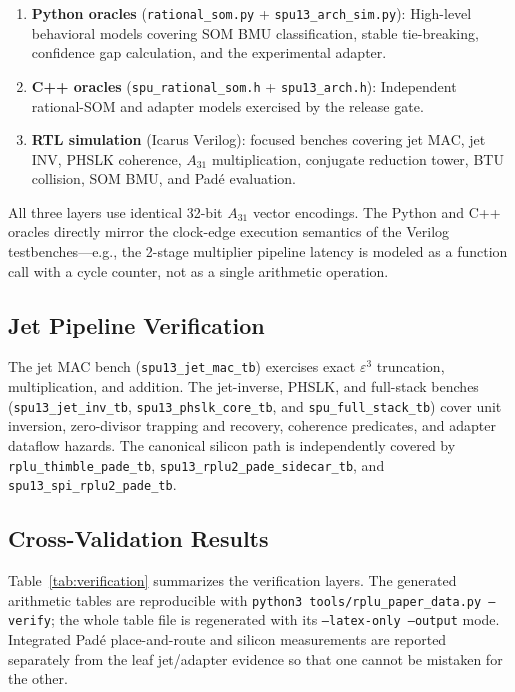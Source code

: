 \documentclass[conference]{IEEEtran}
\begin{document}
\begin{enumerate}
\item \textbf{Python oracles} (\texttt{rational\_som.py} + \texttt{spu13\_arch\_sim.py}):
High-level behavioral models covering SOM BMU classification, stable
tie-breaking, confidence gap calculation, and the experimental adapter.
\item \textbf{C++ oracles} (\texttt{spu\_rational\_som.h} + \texttt{spu13\_arch.h}):
Independent rational-SOM and adapter models exercised by the release gate.
\item \textbf{RTL simulation} (Icarus Verilog): focused benches covering
jet MAC, jet INV, PHSLK coherence, $A_{31}$ multiplication,
conjugate reduction tower, BTU collision, SOM BMU, and Pad\'{e} evaluation.
\end{enumerate}

All three layers use identical 32-bit $A_{31}$ vector encodings.
The Python and C++ oracles directly mirror the clock-edge execution
semantics of the Verilog testbenches---e.g., the 2-stage multiplier
pipeline latency is modeled as a function call with a cycle counter,
not as a single arithmetic operation.

\subsection{Jet Pipeline Verification}

The jet MAC bench (\texttt{spu13\_jet\_mac\_tb}) exercises exact
$\varepsilon^3$ truncation, multiplication, and addition. The jet-inverse,
PHSLK, and full-stack benches (\texttt{spu13\_jet\_inv\_tb},
\texttt{spu13\_phslk\_core\_tb}, and \texttt{spu\_full\_stack\_tb}) cover
unit inversion, zero-divisor trapping and recovery, coherence predicates,
and adapter dataflow hazards. The canonical silicon path is independently
covered by \texttt{rplu\_thimble\_pade\_tb},
\texttt{spu13\_rplu2\_pade\_sidecar\_tb}, and
\texttt{spu13\_spi\_rplu2\_pade\_tb}.

\subsection{Cross-Validation Results}

Table~\ref{tab:verification} summarizes the verification layers.
The generated arithmetic tables are reproducible with
\texttt{python3 tools/rplu\_paper\_data.py --verify}; the whole table file is
regenerated with its \texttt{--latex-only --output} mode. Integrated Pad\'{e}
place-and-route and silicon measurements are reported separately from the
leaf jet/adapter evidence so that one cannot be mistaken for the other.
\end{document}
